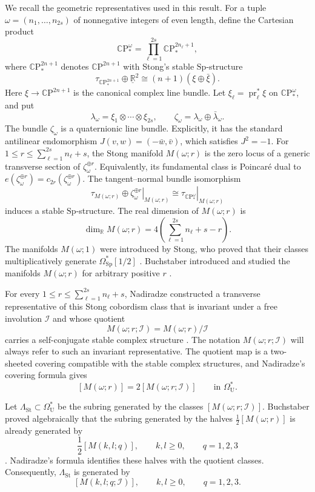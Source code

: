 \documentclass[14pt,dvipsnames]{extarticle}
\numberwithin{equation}{subsection}
\theoremstyle{plain}
\theoremstyle{definition}
\theoremstyle{definition}
\DeclareMathOperator{\pr}{pr}
\newcommand{\OmU}{\Omega_{\mathrm U}^{\ast}}
\newcommand{\OmSp}{\Omega_{\mathrm{Sp}}^{\ast}}
\newcommand{\CP}{\mathbb{C}\mathrm P}
\newcommand{\Sp}{\mathrm{Sp}}
\newcommand{\Ii}{\mathcal I}
\newcommand{\LambdaSt}{\Lambda_{\mathrm{St}}}
\begin{document}
We recall the geometric representatives used in this result. For a tuple
$\omega=(n_1,\ldots,n_{2s})$ of nonnegative integers of even length, define the Cartesian product
\[
\CP_*^\omega
=
\prod_{\ell=1}^{2s}\CP_*^{2n_\ell+1},
\]
where \(\CP_*^{2n+1}\) denotes \(\CP^{2n+1}\) with Stong's stable
\(\Sp\)-structure
\[
\tau_{\CP_*^{2n+1}}\oplus\underline{\mathbb R}^{2}
\cong
(n+1)(\xi\oplus\bar\xi).
\]
Here \(\xi\to\CP^{2n+1}\) is the canonical complex line bundle. Let
\(\xi_\ell=\pr_\ell^{\ast}\xi\) on \(\CP_*^\omega\), and put
\[
\lambda_\omega
=
\xi_1\otimes\cdots\otimes\xi_{2s},
\qquad
\zeta_\omega
=
\lambda_\omega\oplus\bar\lambda_\omega.
\]
The bundle \(\zeta_\omega\) is a quaternionic line bundle. Explicitly, it has
the standard antilinear endomorphism
\(J(v,w)=(-\bar w,\bar v)\), which satisfies \(J^2=-1\). For
\(1\leq r\leq\sum_{\ell=1}^{2s}n_\ell+s\), the Stong manifold
\(M(\omega;r)\) is the zero locus of a generic transverse section of
\(\zeta_\omega^{\oplus r}\). Equivalently,
its fundamental class is Poincar\'e dual to
\(e(\zeta_\omega^{\oplus r})=c_{2r}(\zeta_\omega^{\oplus r})\). The tangent--normal bundle isomorphism
\[
 \tau_{M(\omega;r)}
 \oplus
 \left.\zeta_\omega^{\oplus r}\right|_{M(\omega;r)}
 \cong
 \left.\tau_{\CP_*^\omega}\right|_{M(\omega;r)}
\]
induces a stable \(\Sp\)-structure. The real dimension of \(M(\omega;r)\) is
\[
\dim_{\mathbb R}M(\omega;r)
=
4\left(\sum_{\ell=1}^{2s}n_\ell+s-r\right).
\]
The manifolds \(M(\omega;1)\) were introduced by Stong, who proved that their
classes multiplicatively generate \(\OmSp[1/2]\) \cite{Sto67}. Buchstaber
introduced and studied the manifolds \(M(\omega;r)\) for arbitrary positive
\(r\) \cite[\S~5, before Theorem~5.12]{Buc78}.

For every $1\leq r\leq\sum_{\ell=1}^{2s}n_\ell+s$,
Nadiradze constructed a transverse representative of this Stong cobordism
class that is invariant under a free involution $\Ii$ and whose quotient
\[
 M(\omega;r;\Ii)=M(\omega;r)/\Ii
\]
carries a self-conjugate stable complex structure \cite[pp.~264--265]{Nad80}. The notation
$M(\omega;r;\Ii)$ will always refer to such an invariant representative. The
quotient map is a two-sheeted covering compatible with the stable complex
structures, and Nadiradze's covering formula gives
\[
 [M(\omega;r)]=2[M(\omega;r;\Ii)]
 \qquad\text{in }\OmU.
\]

Let $\LambdaSt\subset\OmU$ be the subring generated by the classes
$[M(\omega;r;\Ii)]$. Buchstaber proved algebraically that the subring generated
by the halves $\tfrac12[M(\omega;r)]$ is already generated by
\[
 \frac12[M(k,l;q)],
 \qquad k,l\geq0,
 \qquad q=1,2,3
\]
\cite[Theorem~5.13]{Buc78}. Nadiradze's formula identifies these halves with the quotient
classes. Consequently, $\LambdaSt$ is generated by
\[
 [M(k,l;q;\Ii)],
 \qquad k,l\geq0,
 \qquad q=1,2,3.
\]
\end{document}
